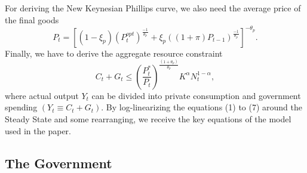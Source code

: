 \documentclass[12pt,a4paper,oneside,titlepage]{article}
\begin{document}
For deriving the New Keynesian Phillips curve, we also need the average price of the final goods
\begin{equation}
P_t = \left[\left(1 - \xi_p\right)\left(P_t^{opt}\right)^{\frac{-1}{\theta_p}} + \xi_p \left(\left(1 + \pi\right)P_{t-1}\right)^{\frac{-1}{\theta_p}} \right]^{-\theta_p}.
\end{equation}
Finally, we have to derive the aggregate resource constraint
\begin{equation}
C_t + G_t \leq \left(\frac{P_t^*}{P_t}\right)^{\frac{\left(1+\theta_p\right)}{\theta_p}} K^\alpha N_t^{1-\alpha},
\end{equation}
where actual output $Y_t$ can be divided into private consumption and government spending $\left(Y_t \equiv C_t + G_t \right)$.\newline
By log-linearizing the equations (1) to (7) around the Steady State and some rearranging, we receive the key equations of the model used in the \citet{Erceg.2014} paper.

\subsection*{The Government}
\end{document}
